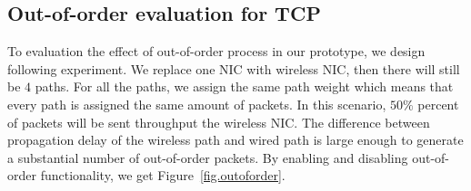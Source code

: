 \begin{figure}[htb]
\end{figure}


\subsection{Out-of-order evaluation for TCP}
\label{sec:reoder}

To evaluation the effect of out-of-order process in our prototype, we design following experiment. We replace one NIC with wireless NIC, then there will still be $4$ paths. For all the paths, we assign the same path weight which means that every path is assigned the same amount of packets. In this scenario, $50\%$ percent of packets will be sent throughput the wireless NIC. The difference between propagation delay of the wireless path and wired path is large enough to generate a substantial number of out-of-order packets. By enabling and disabling out-of-order functionality, we get Figure~\ref{fig.outoforder}.


